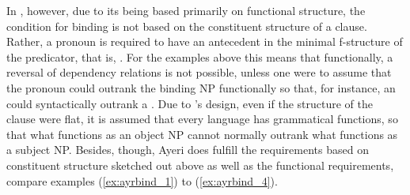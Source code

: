 In \Lfg{}, however, due to its being based primarily on functional structure,
the condition for binding is not based on the constituent structure of a
clause. Rather, a pronoun is required to have an antecedent in the minimal
f-structure of the predicator, that is, 
\parencites[230]{bresnan2016}[250]{bresnan2016}. For the examples
above this means that functionally, a reversal of dependency relations is not
possible, unless one were to assume that the pronoun could outrank the binding
NP functionally so that, for instance, an \Obj{} could syntactically outrank a
\Subj{}. Due to \Lfg{}'s design, even if the structure of the clause were flat,
it is assumed that every language has grammatical functions, so that what
functions as an object NP cannot normally outrank what functions as a subject
NP. Besides, though, Ayeri does fulfill the requirements based on constituent
structure sketched out above as well as the functional requirements, compare
examples (\ref{ex:ayrbind_1}) to (\ref{ex:ayrbind_4}).

